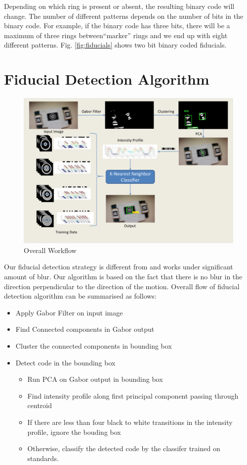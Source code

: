 \documentclass[runningheads]{llncs}
\begin{document}
Depending on which ring is present or absent, the resulting binary code will
change. The number of different patterns depends on the number of bits in the
binary code. For example, if the binary code has three bits, there will be a
maximum of three rings between``marker'' rings and we end up with eight
different patterns. Fig. \ref{fig:fiducials} shows two bit binary coded
fiducials.

\section{Fiducial Detection Algorithm}
\begin{figure}
\includegraphics[width=\linewidth]{overall_flow.pdf}
\caption{Overall Workflow}
\end{figure}
Our fiducial detection strategy is different from \cite{NaimarkF02} and works
under significant amount of blur. Our algorithm is based on the fact that there
is no blur in the direction perpendicular to the direction of the motion.
Overall flow of fiducial detection algorithm can be summarised as follows:
\begin{itemize}
  \item Apply Gabor Filter on input image
  \item Find Connected components in Gabor output
  \item Cluster the connected components in bounding box
  \item Detect code in the bounding box
  \begin{itemize}
    \item Run PCA on Gabor output in bounding box
    \item Find intensity profile along first principal component passing through
    centroid
    \item If there are less than four black to white transitions in the
    intensity profile, ignore the bouding box
    \item Otherwise, classify the detected code by the classifer trained on
    standards.
  \end{itemize}
\end{itemize}
\end{document}
